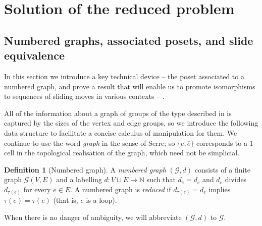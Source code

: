 \documentclass[11pt, a4 paper]{amsart}
\numberwithin{equation}{section}
\theoremstyle{remark}
\theoremstyle{definition}
\newtheorem{definition}[theorem]{Definition}
\def\N{\mathbb N}
\def\-{\overline}
\def\t{\tau}
\def\-{\overline}
\begin{document}
\section{Solution of the reduced problem}

\subsection{
	Numbered graphs, associated posets, and slide equivalence}
\label{s:poset-slides}

In this section we introduce a key technical device -- 
the poset associated to a numbered graph, 
and prove a result that will enable us to promote isomorphisms
to sequences of sliding moves in various contexts -- 
. 

All of the information about a graph of groups 
of the type described in  
is captured by the sizes of the vertex and edge groups, 
so we introduce the following data structure 
to facilitate a concise calculus of manipulation for them. 
We continue to use the word {\em graph} in the sense of Serre; 
so $\{e,\-e\}$ corresponds to a 1-cell 
in the topological realisation of the graph, 
which need not be simplicial. 

\begin{definition}
[Numbered graph] 
\label{def:numbered_graph}
	A \emph{numbered graph} $(\mathcal{G},d)$ consists of
	a finite graph $\mathcal{G}(V,E)$ 
	and a labelling $d:V\sqcup E\to \N$ such that 
	$d_e=d_{\-e}$ and $d_e$ divides $d_{\t(e)}$ for every $e\in E$. 
	A numbered graph is \emph{reduced} 
	if $d_{\t(e)} = d_e$ implies $\t(e) = \t(\-e)$ 
	(that is, $e$ is a loop).
	
	When there is no danger of ambiguity, 
	we will abbreviate $(\mathcal{G},d)$ to $\mathcal{G}$. 
\end{definition}
\end{document}
